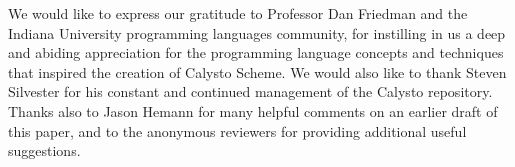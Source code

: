 \documentclass[acmsmall,screen,nonacm]{acmart}
\begin{document}
\begin{acks}
We would like to express our gratitude to Professor Dan Friedman and the
Indiana University programming languages community, for instilling in us a deep
and abiding appreciation for the programming language concepts and techniques
that inspired the creation of Calysto Scheme.  We would also like to thank
Steven Silvester for his constant and continued management of the Calysto
repository. Thanks also to Jason Hemann for many helpful comments on an
earlier draft of this paper, and to the anonymous reviewers for providing
additional useful suggestions.
\end{acks}



\end{document}

